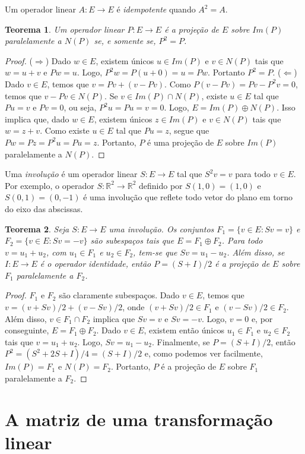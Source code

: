 \documentclass[12pt,a4paper]{article}
\newcommand{\R}{\mathbb{R}}
\newtheorem{thm}{Teorema}[section]
\theoremstyle{definition}
\begin{document}
Um operador linear $A:E\to E$ é \textit{idempotente} quando $A^2=A$.

\begin{thm}
  Um operador linear $P:E\to E$ é a projeção de $E$ sobre $Im(P)$
  paralelamente a $N(P)$ se, e somente se, $P^2=P$.
\end{thm}
\begin{proof}
  ($\Rightarrow$) Dado $w\in E$, existem únicos $u\in Im(P)$ e
  $v\in N(P)$ tais que $w=u+v$ e $Pw=u$. Logo,
  $P^2w=P(u+0)=u=Pw$. Portanto $P^2=P$. ($\Leftarrow$) Dado $v\in E$,
  temos que $v=Pv+(v-Pv)$. Como $P(v-Pv)=Pv-P^2v=0$, temos que
  $v-Pv\in N(P)$. Se $v\in Im(P)\cap N(P)$, existe $u\in E$ tal que
  $Pu=v$ e $Pv=0$, ou seja, $P^2u=Pu=v=0$. Logo, $E=Im(P)\oplus
  N(P)$. Isso implica que, dado $w\in E$, existem únicos $z\in Im(P)$
  e $v\in N(P)$ tais que $w=z+v$. Como existe $u\in E$ tal que $Pu=z$,
  segue que $Pw=Pz=P^2u=Pu=z$. Portanto, $P$ é uma projeção de $E$
  sobre $Im(P)$ paralelamente a $N(P)$.
\end{proof}

Uma \textit{involução} é um operador linear $S:E\to E$ tal que
$S^2v=v$ para todo $v\in E$. Por exemplo, o operador $S:\R^2\to\R^2$
definido por $S(1,0)=(1,0)$ e $S(0,1)=(0,-1)$ é uma involução que
reflete todo vetor do plano em torno do eixo das abscissas.

\begin{thm}
  Seja $S:E\to E$ uma involução. Os conjuntos $F_1=\{v\in E:Sv=v\}$ e
  $F_2=\{v\in E:Sv=-v\}$ são subespaços tais que $E=F_1\oplus
  F_2$. Para todo $v=u_1+u_2$, com $u_1\in F_1$ e $u_2\in F_2$, tem-se
  que $Sv=u_1-u_2$. Além disso, se $I:E\to E$ é o operador identidade,
  então $P=(S+I)/2$ é a projeção de $E$ sobre $F_1$ paralelamente a
  $F_2$.
\end{thm}
\begin{proof}
  $F_1$ e $F_2$ são claramente subespaços. Dado $v\in E$, temos que
  $v=(v+Sv)/2+(v-Sv)/2$, onde $(v+Sv)/2\in F_1$ e $(v-Sv)/2\in
  F_2$. Além disso, $v\in F_1\cap F_2$ implica que $Sv=v$ e
  $Sv=-v$. Logo, $v=0$ e, por conseguinte, $E=F_1\oplus F_2$. Dado
  $v\in E$, existem então únicos $u_1\in F_1$ e $u_2\in F_2$ tais que
  $v=u_1+u_2$. Logo, $Sv=u_1-u_2$. Finalmente, se $P=(S+I)/2$, então
  $P^2=(S^2+2S+I)/4=(S+I)/2$ e, como podemos ver facilmente,
  $Im(P)=F_1$ e $N(P)=F_2$. Portanto, $P$ é a projeção de $E$ sobre
  $F_1$ paralelamente a $F_2$.
\end{proof}

\section{A matriz de uma transformação linear}
\end{document}
